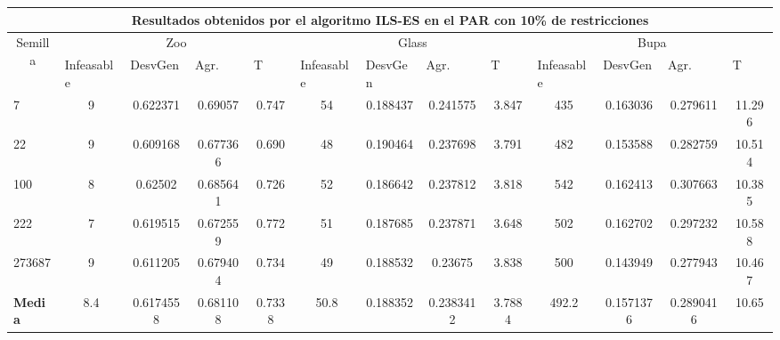 \begin{table}[H]
\begin{adjustwidth}{-1cm}{-1cm}
	\begin{tabular}{|l|c|c|c|c|c|c|c|c|c|c|c|c|}
	\hline
	\multicolumn{13}{|c|}{\textbf{Resultados obtenidos por el algoritmo ILS-ES en el PAR con 10\% de restricciones}}                                                                                                                                                                                                                                                                                                                                            \\ \hline
	\multicolumn{1}{|c|}{\multirow{2}{*}{Semilla}} & \multicolumn{4}{c|}{Zoo}                                                                                          & \multicolumn{4}{c|}{Glass}                                                                                         & \multicolumn{4}{c|}{Bupa}                                                                                          \\ \cline{2-13} 
	\multicolumn{1}{|c|}{}                                  & \multicolumn{1}{l|}{Infeasable} & \multicolumn{1}{l|}{DesvGen} & \multicolumn{1}{l|}{Agr.} & \multicolumn{1}{l|}{T} & \multicolumn{1}{l|}{Infeasable} & \multicolumn{1}{l|}{DesvGen} & \multicolumn{1}{l|}{Agr.} & \multicolumn{1}{l|}{T} & \multicolumn{1}{l|}{Infeasable} & \multicolumn{1}{l|}{DesvGen} & \multicolumn{1}{l|}{Agr.} & \multicolumn{1}{l|}{T} \\ \hline
	7   	& 9 & 0.622371 & 0.69057 & 0.747 &				54 & 0.188437 & 0.241575 & 3.847 &			 	435 & 0.163036 & 0.279611 & 11.296		\\ \hline
	22 		& 9 & 0.609168 & 0.677366 & 0.690 &				48 & 0.190464 & 0.237698 & 3.791 &		 	482 & 0.153588 & 0.282759 & 10.514		\\ \hline
	100 	& 8 & 0.62502 & 0.685641 & 0.726 &				52 & 0.186642 & 0.237812 & 3.818 &				542 & 0.162413 & 0.307663 & 10.385		\\ \hline
	222 	& 7 & 0.619515 & 0.672559 & 0.772 &				51 & 0.187685 & 0.237871 & 3.648 & 			502 & 0.162702 & 0.297232 & 10.588			\\ \hline
	273687 	& 9 & 0.611205 & 0.679404 & 0.734 &				49 & 0.188532 & 0.23675 & 3.838 &			500 & 0.143949 & 0.277943 & 10.467		\\ \hline
	\textbf{Media} &  8.4&	0.6174558	&0.681108&	0.7338&	50.8	&0.188352	&0.2383412	&3.7884&	492.2	&0.1571376	&0.2890416	&10.65   \\ \hline
	\end{tabular}
	
	\end{adjustwidth}
	
\end{table}

